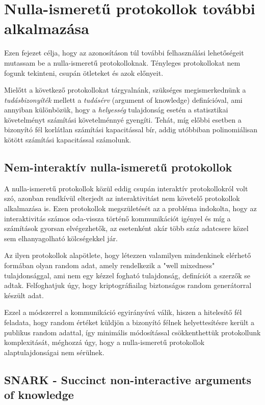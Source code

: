 \chapter{Nulla-ismeretű protokollok további alkalmazása}

Ezen fejezet célja, hogy az azonosításon túl további felhasználási lehetőségeit mutassam be a nulla-ismeretű protokolloknak. Tényleges protokollokat nem fogunk tekinteni, csupán ötleteket és azok előnyeit.

Mielőtt a következő protokollokat tárgyalnánk, szükséges megismerkednünk a \textit{tudásbizonyíték} mellett a \textit{tudásérv} (argument of knowledge) definícióval, ami annyiban különbözük, hogy a \textit{helyesség} tulajdonság esetén a statisztikai követelményt számítási követelménnyé gyengíti. Tehát, míg előbbi esetben a bizonyító fél korlátlan számítási kapacitással bír, addig utóbbiban polinomiálisan kötött számítási kapacitással számolunk.

\section{Nem-interaktív nulla-ismeretű protokollok}

A nulla-ismeretű protokollok közül eddig csupán interaktív protokollokról volt szó, azonban rendkívül elterjedt az interaktivitást nem követelő protokollok alkalmazása is. Ezen protokollok megszületését az a probléma indokolta, hogy az interaktivitás számos oda-vissza történő kommunikációt igényel és míg a számítások gyorsan elvégezhetők, az esetenként akár több száz adatcsere közel sem elhanyagolható kölcségekkel jár. 

Az ilyen protokollok \cite{NIZK, NIZK2} alapötlete, hogy létezzen valamilyen mindenkinek elérhető formában olyan random adat, amely rendelkezik a "well mixedness" tulajdonsággal, ami nem egy kézzel fogható tulajdonság, definíciót a szerzők se adtak. Felfoghatjuk úgy, hogy kriptográfiailag biztonságos random generátorral készült adat.

Ezzel a módszerrel a kommunikáció egyirányúvá válik, hiszen a hitelesítő fél feladata, hogy random értéket küldjön a bizonyító félnek helyettesítésre került a publikus random adattal, így minimális módosítással csökkenthettük protokollunk komplexitását, méghozzá úgy, hogy a nulla-ismeretű protokollok alaptulajdonságai nem sérülnek.

\section{SNARK - Succinct non-interactive arguments of knowledge}

